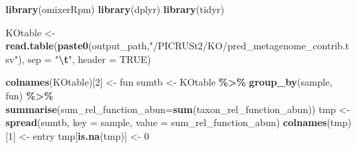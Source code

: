 \documentclass[
]{article}
\newenvironment{Shaded}{\begin{snugshade}}{\end{snugshade}}
\newcommand{\AttributeTok}[1]{\textcolor[rgb]{0.13,0.29,0.53}{#1}}
\newcommand{\ConstantTok}[1]{\textcolor[rgb]{0.56,0.35,0.01}{#1}}
\newcommand{\DecValTok}[1]{\textcolor[rgb]{0.00,0.00,0.81}{#1}}
\newcommand{\FunctionTok}[1]{\textcolor[rgb]{0.13,0.29,0.53}{\textbf{#1}}}
\newcommand{\NormalTok}[1]{#1}
\newcommand{\OtherTok}[1]{\textcolor[rgb]{0.56,0.35,0.01}{#1}}
\newcommand{\SpecialCharTok}[1]{\textcolor[rgb]{0.81,0.36,0.00}{\textbf{#1}}}
\newcommand{\StringTok}[1]{\textcolor[rgb]{0.31,0.60,0.02}{#1}}
\begin{document}
\begin{Shaded}
\begin{Highlighting}[]
\FunctionTok{library}\NormalTok{(omixerRpm)}
\FunctionTok{library}\NormalTok{(dplyr)}
\FunctionTok{library}\NormalTok{(tidyr)}

\NormalTok{KOtable }\OtherTok{\textless{}{-}} \FunctionTok{read.table}\NormalTok{(}\FunctionTok{paste0}\NormalTok{(output\_path,}\StringTok{"/PICRUSt2/KO/pred\_metagenome\_contrib.tsv"}\NormalTok{), }\AttributeTok{sep =} \StringTok{"}\SpecialCharTok{\textbackslash{}t}\StringTok{"}\NormalTok{, }\AttributeTok{header =} \ConstantTok{TRUE}\NormalTok{)}

\FunctionTok{colnames}\NormalTok{(KOtable)[}\DecValTok{2}\NormalTok{] }\OtherTok{\textless{}{-}} \StringTok{\textquotesingle{}fun\textquotesingle{}}
\NormalTok{sumtb }\OtherTok{\textless{}{-}}\NormalTok{ KOtable }\SpecialCharTok{\%\textgreater{}\%} \FunctionTok{group\_by}\NormalTok{(sample, fun) }\SpecialCharTok{\%\textgreater{}\%} \FunctionTok{summarise}\NormalTok{(}\AttributeTok{sum\_rel\_function\_abun=}\FunctionTok{sum}\NormalTok{(taxon\_rel\_function\_abun))}
\NormalTok{tmp }\OtherTok{\textless{}{-}} \FunctionTok{spread}\NormalTok{(sumtb, }\AttributeTok{key =}\NormalTok{ sample, }\AttributeTok{value =}\NormalTok{ sum\_rel\_function\_abun)}
\FunctionTok{colnames}\NormalTok{(tmp)[}\DecValTok{1}\NormalTok{] }\OtherTok{\textless{}{-}} \StringTok{\textquotesingle{}entry\textquotesingle{}}
\NormalTok{tmp[}\FunctionTok{is.na}\NormalTok{(tmp)] }\OtherTok{\textless{}{-}} \DecValTok{0}


\end{Highlighting}
\end{Shaded}
\end{document}
